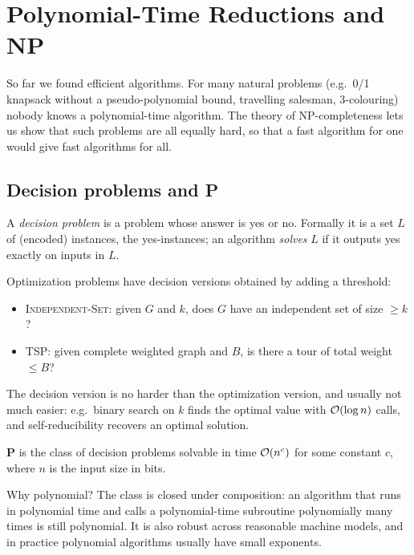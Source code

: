 \chapter{Polynomial-Time Reductions and NP}


So far we found efficient algorithms. For many natural problems (e.g.\ 0/1 knapsack without a pseudo-polynomial bound, travelling salesman,
3-colouring) nobody knows a polynomial-time algorithm. The theory of NP-completeness lets us show that such problems are all
equally hard, so that a fast algorithm for one would give fast algorithms for all.

\section{Decision problems and P}
\begin{definition}
A \emph{decision problem} is a problem whose answer is yes or no. Formally it is a set $L$ of (encoded) instances, the yes-instances;
an algorithm \emph{solves} $L$ if it outputs yes exactly on inputs in $L$.
\end{definition}
Optimization problems have decision versions obtained by adding a threshold:
\begin{itemize}
  \item \textsc{Independent-Set}: given $G$ and $k$, does $G$ have an independent set of size $\ge k$?
  \item \textsc{TSP}: given complete weighted graph and $B$, is there a tour of total weight $\le B$?
\end{itemize}
The decision version is no harder than the optimization version, and usually not much easier: e.g.\ binary search on $k$ finds the optimal value with
$\mathcal{O}(\log n)$ calls, and self-reducibility recovers an optimal solution.

\begin{definition}
$\mathbf{P}$ is the class of decision problems solvable in time $\mathcal{O}(n^c)$ for some constant $c$, where $n$ is the input size in bits.
\end{definition}
Why polynomial? The class is closed under composition: an algorithm that runs in polynomial time and calls a polynomial-time subroutine polynomially many times is still polynomial. It is also
robust across reasonable machine models, and in practice polynomial algorithms usually have small exponents.

